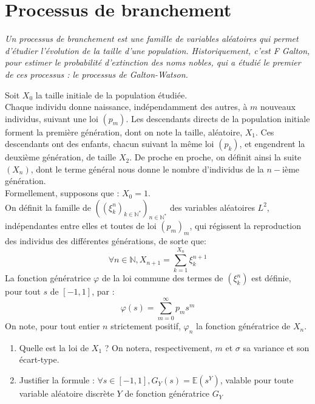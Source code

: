 \section{Processus de branchement}

\begin{exer}%
\begin{center}
\textit{
Un processus de branchement est une famille de variables al\'eatoires qui permet d'\'etudier l'\'evolution de la taille d'une population.%
Historiquement, c'est F Galton, pour estimer le probabilit\'e d'extinction des noms nobles, qui a \'etudi\'e le premier de ces processus : le processus de Galton-Watson.\\
}
\end{center}
\ligneinter
Soit $X_0$ la taille initiale de la population \'etudi\'ee.\\
Chaque individu donne naissance, ind\'ependamment des autres, \`a $m$ nouveaux individus, suivant une loi $(p_m)$. %
Les descendants directs de la population initiale forment la premi\`ere g\'en\'eration, dont on note la taille, al\'eatoire, $X_1$. Ces descendants ont des enfants, chacun suivant la m\^eme loi $(p_k)$, et engendrent la deuxi\`eme g\'en\'eration, de taille $X_2$. %
De proche en proche, on d\'efinit ainsi la suite $(X_n)$, dont le terme g\'en\'eral nous donne le nombre d'individus de la $n-$i\`eme g\'en\'eration.\\
Formellement, supposons que : $X_0=1$.\\
On d\'efinit la famille de $((\xi_k^{n})_{k\in\mathbb{N}^{\ast}})_{n\in\mathbb{N}^{\ast}}$ des variables al\'eatoires $L^2$, ind\'ependantes entre elles et toutes de loi $(p_m)_m$, qui r\'egissent la reproduction des individus des diff\'erentes g\'en\'erations, de sorte que:
\[\forall n \in \mathbb{N} , X_{n+1}=\sum\limits_{k=1}^{X_n} \xi_k^{n+1}\]
La fonction g\'en\'eratrice $\varphi$ de la loi commune des termes de $(\xi_k^n)$ est d\'efinie, pour tout $s$ de $[-1,1]$, par :\[\varphi(s)=\sum\limits_{m=0}^{\infty}p_m s^m\]
On note, pour tout entier $n$ strictement positif, $\varphi_n$ la fonction g\'en\'eratrice de $X_n$.
\ligneinter
\begin{enumerate}
\item Quelle est la loi de $X_1$ ?
On notera, respectivement, $m$ et $\sigma$ sa variance et son \'ecart-type.
\item Justifier la formule : $\forall s \in [-1,1], G_Y(s)=\mathbb{E}(s^Y)$, valable pour toute variable al\'eatoire discr\`ete $Y$ de fonction g\'en\'eratrice $G_Y$ %

\end{enumerate}
\end{exer}

